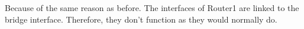 Because of the same reason as before. The interfaces of Router1 are linked to the bridge interface. Therefore, they don't function as they would normally do.
